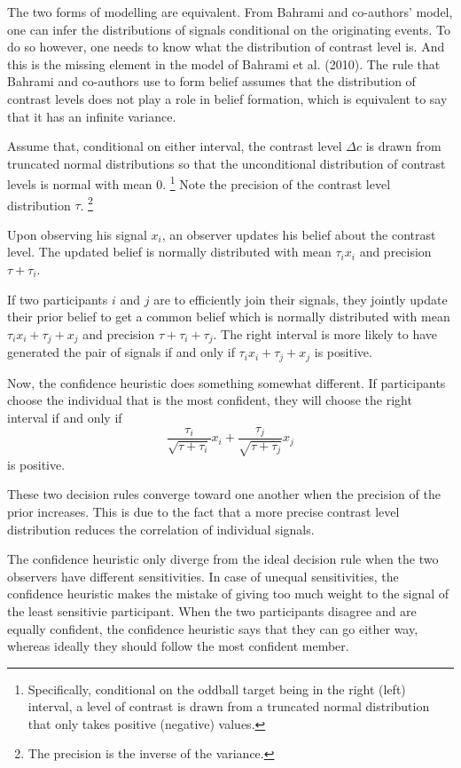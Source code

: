 \documentclass[12pt]{report}
\begin{document}
The two forms of modelling are equivalent. From Bahrami and co-authors' model, one can infer the distributions of signals conditional on the originating events. To do so however, one needs to know what the distribution of contrast level is. And this is the missing element in the model of Bahrami et al. (2010). The rule that Bahrami and co-authors use to form belief assumes that the distribution of contrast levels does not play a role in belief formation, which is equivalent to say that it has an infinite variance. 

Assume that, conditional on either interval, the contrast level $\Delta c$ is drawn from truncated normal distributions so that the unconditional distribution of contrast levels is normal with mean 0. \footnote{Specifically, conditional on the oddball target being in the right (left) interval, a level of contrast is drawn from a truncated normal distribution that only takes positive (negative) values. } Note the precision of the contrast level distribution $\tau$. \footnote{The precision is the inverse of the variance.} 

Upon observing his signal $x_i$, an observer updates his belief about the contrast level. The updated belief is normally distributed with mean $\tau_i x_i$ and precision $\tau + \tau_i$. 

If two participants $i$ and $j$ are to efficiently join their signals, they jointly update their prior belief to get a common belief which is normally distributed with mean $\tau_i x_i + \tau_j + x_j$ and precision $\tau + \tau_i + \tau_j$. The right interval is more likely to have generated the pair of signals if and only if $\tau_i x_i + \tau_j + x_j$ is positive. 

Now, the confidence heuristic does something somewhat different. If participants choose the individual that is the most confident, they will choose the right interval if and only if $$ \frac{\tau_i}{\sqrt{\tau+\tau_i}} x_i + \frac{\tau_j}{\sqrt{\tau+\tau_j}} x_j $$ is positive. 

These two decision rules converge toward one another when the precision of the prior increases. This is due to the fact that a more precise contrast level distribution reduces the correlation of individual signals. 

The confidence heuristic only diverge from the ideal decision rule when the two observers have different sensitivities. In case of unequal sensitivities, the confidence heuristic makes the mistake of giving too much weight to the signal of the least sensitivie participant. When the two participants disagree and are equally confident, the confidence heuristic says that they can go either way, whereas ideally they should follow the most confident member. 
\end{document}
